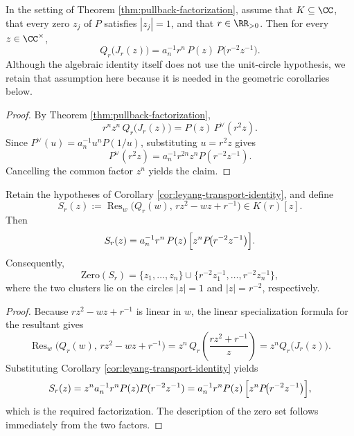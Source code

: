 \begin{corollary}\label{cor:leyang-transport-identity}
In the setting of Theorem \ref{thm:pullback-factorization}, assume that \(K\subseteq\CC\), that every zero \(z_j\) of \(P\) satisfies \(|z_j|=1\), and that \(r\in\RR_{>0}\). Then for every \(z\in\CC^\times\),
\[
Q_r\!\bigl(J_r(z)\bigr)=a_n^{-1}r^n\,P(z)\,P\!\bigl(r^{-2}z^{-1}\bigr).
\]
Although the algebraic identity itself does not use the unit-circle hypothesis, we retain that assumption here because it is needed in the geometric corollaries below.
\end{corollary}

\begin{proof}
By Theorem \ref{thm:pullback-factorization},
\[
r^n z^n\,Q_r\!\bigl(J_r(z)\bigr)=P(z)\,P^{\vee}(r^2 z).
\]
Since \(P^{\vee}(u)=a_n^{-1}u^nP(1/u)\), substituting \(u=r^2 z\) gives
\[
P^{\vee}(r^2 z)=a_n^{-1}r^{2n}z^n P(r^{-2}z^{-1}).
\]
Cancelling the common factor \(z^n\) yields the claim.
\end{proof}

\begin{corollary}\label{cor:leyang-double-resultant}
Retain the hypotheses of Corollary \ref{cor:leyang-transport-identity}, and define
\[
S_r(z):=\operatorname{Res}_w\!\bigl(Q_r(w),\,r z^2-w z+r^{-1}\bigr)\in K(r)[z].
\]
Then
\[
S_r(z)=a_n^{-1} r^{n}\,P(z)\,\Bigl[z^{n}P\!\bigl(r^{-2}z^{-1}\bigr)\Bigr].
\]
Consequently,
\[
\mathrm{Zero}(S_r)
=\{z_1,\dots,z_n\}\cup\{r^{-2}z_1^{-1},\dots,r^{-2}z_n^{-1}\},
\]
where the two clusters lie on the circles \(|z|=1\) and \(|z|=r^{-2}\), respectively.
\end{corollary}

\begin{proof}
Because \(r z^2-w z+r^{-1}\) is linear in \(w\), the linear specialization formula for the resultant gives
\[
\operatorname{Res}_w\!\bigl(Q_r(w),\,r z^2-w z+r^{-1}\bigr)
=z^n\,Q_r\!\left(\frac{r z^2+r^{-1}}{z}\right)
=z^n Q_r\!\bigl(J_r(z)\bigr).
\]
Substituting Corollary \ref{cor:leyang-transport-identity} yields
\[
S_r(z)=z^n a_n^{-1}r^n P(z)P(r^{-2}z^{-1})
=a_n^{-1}r^{n}P(z)\,\Bigl[z^{n}P\!\bigl(r^{-2}z^{-1}\bigr)\Bigr],
\]
which is the required factorization. The description of the zero set follows immediately from the two factors.
\end{proof}


